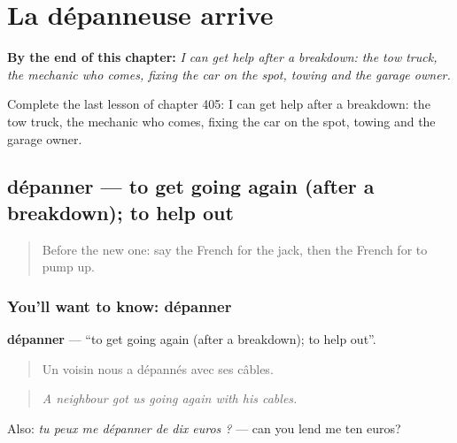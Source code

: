 
\chapter{La dépanneuse arrive}
\label{ch:fr-la-depanneuse-arrive}

\begin{chapteropening}
\textbf{By the end of this chapter:} \emph{I can get help after a breakdown: the tow truck, the mechanic who comes, fixing the car on the spot, towing and the garage owner.}

Complete the last lesson of chapter 405: I can get help after a breakdown: the tow truck, the mechanic who comes, fixing the car on the spot, towing and the garage owner.
\end{chapteropening}

\section[dépanner]{dépanner — to get going again (after a breakdown); to help out}

\label{lesson:FR-C405-depanner}



\begin{quote}
Before the new one: say the French for the jack, then the French for to pump up.
\end{quote}

\subsection*{You'll want to know: dépanner}
\textbf{dépanner} — \textquotedblleft{}to get going again (after a breakdown); to help out\textquotedblright{}.

\begin{quote}
Un voisin nous a dépannés avec ses câbles.
\end{quote}

\begin{quote}
\emph{A neighbour got us going again with his cables.}
\end{quote}

Also: \emph{tu peux me dépanner de dix euros ?} — can you lend me ten euros?

